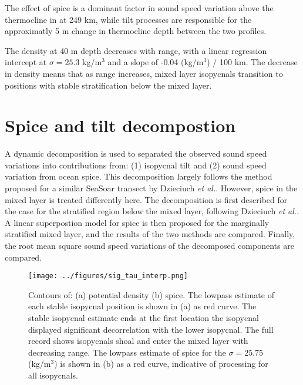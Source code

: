 \documentclass[preprint,NumberedRefs]{JASA}
\begin{document}
The effect of spice is a dominant factor in sound speed variation above the thermocline in at 249 km, while tilt processes are responsible for the approximatly 5 m change in thermocline depth between the two profiles.

The density at 40 m depth decreases with range, with a linear regression intercept at $\sigma=25.3$ kg/m$^3$ and a slope of -0.04 (kg/m$^3$) / 100 km. The decrease in density means that as range increases, mixed layer isopycnals transition to positions with stable stratification below the mixed layer.

\section{\label{sec:decomposition}Spice and tilt decompostion}
A dynamic decomposition is used to separated the observed sound speed variations into contributions from: (1) isopycnal tilt and (2) sound speed variation from ocean spice. This decomposition largely follows the method proposed for a similar SeaSoar transect by Dzieciuch \emph{et al.}\citep{dzieciuch2004}. However, spice in the mixed layer is treated differently here. The decomposition is first described for the case for the stratified region below the mixed layer, following Dzieciuch \emph{et al.}\citep{dzieciuch2004}. A linear superpostion model for spice is then proposed for the marginally stratified mixed layer, and the results of the two methods are compared. Finally, the root mean square sound speed variations of the decomposed components are compared.

\begin{figure}
\texttt{[image: ../figures/sig\_tau\_interp.png]}
    \caption{\label{fig:cntrs}{Contours of: (a) potential density (b) spice. The lowpass estimate of each stable isopycnal position is shown in (a) as red curve. The stable isopycnal estimate ends at the first location the isopycnal displayed significant decorrelation with the lower isopycnal. The full record shows isopycnals shoal and enter the mixed layer with decreasing range. The lowpass estimate of spice for the $\sigma=25.75$ (kg/m$^3$) is shown in (b) as a red curve, indicative of processing for all isopycnals.}}
\end{figure}
\end{document}
